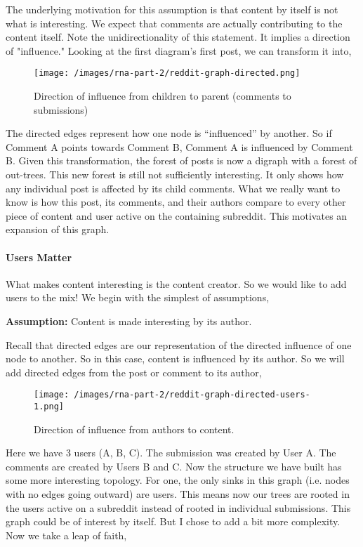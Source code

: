 The underlying motivation for this assumption is that content by itself is not what is interesting.
We expect that comments are actually contributing to the content itself.
Note the unidirectionality of this statement.
It implies a direction of "influence."
Looking at the first diagram's first post, we can transform it into,
%
\begin{figure}
    \texttt{[image: /images/rna-part-2/reddit-graph-directed.png]}
    \caption{Direction of influence from children to parent (comments to submissions)}
\end{figure}
%
The directed edges represent how one node is ``influenced'' by another.
So if Comment A points towards Comment B, Comment A is influenced by Comment B.
Given this transformation, the forest of posts is now a digraph with a forest of out-trees.
This new forest is still not sufficiently interesting.
It only shows how any individual post is affected by its child comments.
What we really want to know is how this post, its comments, and their authors compare to every other piece of content and user active on the containing subreddit.
This motivates an expansion of this graph.

\paragraph{Users Matter}
What makes content interesting is the content creator.
So we would like to add users to the mix! We begin with the simplest of assumptions,

\textbf{Assumption:} Content is made interesting by its author.

Recall that directed edges are our representation of the directed influence of one node to another.
So in this case, content is influenced by its author.
So we will add directed edges from the post or comment to its author,
%
\begin{figure}
    \texttt{[image: /images/rna-part-2/reddit-graph-directed-users-1.png]}
    \caption{Direction of influence from authors to content.}
\end{figure}
%
Here we have 3 users (A, B, C).
The submission was created by User A.
The comments are created by Users B and C.
Now the structure we have built has some more interesting topology.
For one, the only sinks in this graph (i.e. nodes with no edges going outward) are users.
This means now our trees are rooted in the users active on a subreddit instead of rooted in individual submissions.
This graph could be of interest by itself.
But I chose to add a bit more complexity. Now we take a leap of faith,

